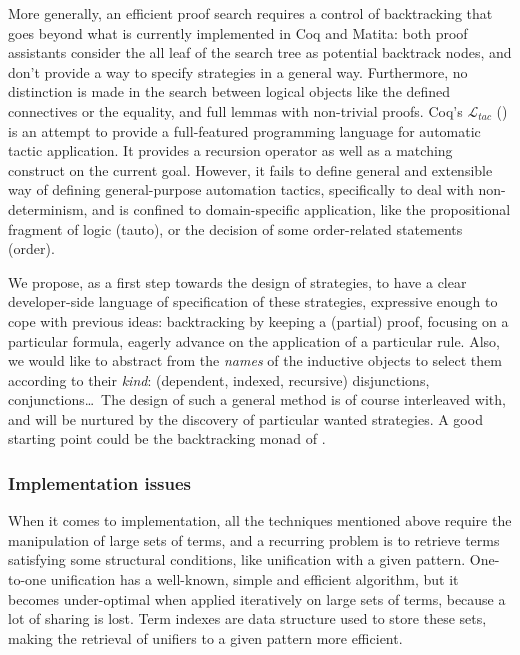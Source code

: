 \documentclass[twoside,a4paper,12pt]{article}
\begin{document}
More generally, an efficient proof search requires a control of
backtracking that goes beyond what is currently implemented in
\textsf{Coq} and \textsf{Matita}: both proof assistants consider the
all leaf of the search tree as potential backtrack nodes, and don't
provide a way to specify strategies in a general way. Furthermore, no
distinction is made in the search between logical objects like the
defined connectives or the equality, and full lemmas with non-trivial
proofs. \textsf{Coq}'s $\mathcal L_{tac}$
(\cite{delahaye2001conception}) is an attempt to provide a
full-featured programming language for automatic tactic application.
It provides a recursion operator as well as a matching construct on
the current goal. However, it fails to define general and extensible
way of defining general-purpose automation tactics, specifically to
deal with non-determinism, and is confined to domain-specific
application, like the propositional fragment of logic
(\textsf{tauto}), or the decision of some order-related statements
(\textsf{order}).

We propose, as a first step towards the design of strategies, to have
a clear developer-side language of specification of these strategies,
expressive enough to cope with previous ideas: backtracking by keeping
a (partial) proof, focusing on a particular formula, eagerly advance
on the application of a particular rule. Also, we would like to
abstract from the \emph{names} of the inductive objects to select them
according to their \emph{kind}: (dependent, indexed, recursive)
disjunctions, conjunctions\ldots\ The design of such a general method
is of course interleaved with, and will be nurtured by the discovery
of particular wanted strategies. A good starting point could be the
backtracking monad of \cite{kiselyov2005backtracking}.

\subsubsection{Implementation issues}
\label{sec:implem}

When it comes to implementation, all the techniques mentioned above
require the manipulation of large sets of terms, and a recurring
problem is to retrieve terms satisfying some structural conditions,
like unification with a given pattern. One-to-one unification has a
well-known, simple and efficient algorithm, but it becomes
under-optimal when applied iteratively on large sets of terms, because
a lot of sharing is lost. Term indexes are data structure used to
store these sets, making the retrieval of unifiers to a given pattern
more efficient.
\end{document}
